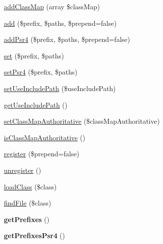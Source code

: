 \begin{DoxyCompactItemize}
\item 
\hyperlink{classComposer_1_1Autoload_1_1ClassLoader_a246d6f628e6ae99bf0ce65b0212f833a}{add\+Class\+Map} (array \$class\+Map)
\item 
\hyperlink{classComposer_1_1Autoload_1_1ClassLoader_aa99f46d61bdf20b924a1bb08bfcb90bd}{add} (\$prefix, \$paths, \$prepend=false)
\item 
\hyperlink{classComposer_1_1Autoload_1_1ClassLoader_a8831c0a7bb01fa44b4cb7a72ec111cf1}{add\+Psr4} (\$prefix, \$paths, \$prepend=false)
\item 
\hyperlink{classComposer_1_1Autoload_1_1ClassLoader_a76f8e2aa4329d78063cc7932108891ce}{set} (\$prefix, \$paths)
\item 
\hyperlink{classComposer_1_1Autoload_1_1ClassLoader_a11d2831d7657855b5c07cb6885dd86ef}{set\+Psr4} (\$prefix, \$paths)
\item 
\hyperlink{classComposer_1_1Autoload_1_1ClassLoader_a350f3d947ee3e29b0ac0e09e4a086642}{set\+Use\+Include\+Path} (\$use\+Include\+Path)
\item 
\hyperlink{classComposer_1_1Autoload_1_1ClassLoader_aeb0360ce32c89c3d50cf5b054aef0d59}{get\+Use\+Include\+Path} ()
\item 
\hyperlink{classComposer_1_1Autoload_1_1ClassLoader_ab393ccb89c488ca52fe97865b0957196}{set\+Class\+Map\+Authoritative} (\$class\+Map\+Authoritative)
\item 
\hyperlink{classComposer_1_1Autoload_1_1ClassLoader_abaf3d2e9cad5d740b6a29c44b36cf015}{is\+Class\+Map\+Authoritative} ()
\item 
\hyperlink{classComposer_1_1Autoload_1_1ClassLoader_a478eedf860efe1bc1b2408fc28656111}{register} (\$prepend=false)
\item 
\hyperlink{classComposer_1_1Autoload_1_1ClassLoader_a2472d57551ee473381beea31ff642136}{unregister} ()
\item 
\hyperlink{classComposer_1_1Autoload_1_1ClassLoader_aee0b004fbf0743f16dab70f8a52f983e}{load\+Class} (\$class)
\item 
\hyperlink{classComposer_1_1Autoload_1_1ClassLoader_a505e9f4e4a29f6bd47bc694e78ae46c3}{find\+File} (\$class)
\item 
{\bfseries get\+Prefixes} ()\hypertarget{classComposer_1_1Autoload_1_1ClassLoader_af3d914a2e97ec1118f3d70e5a0ce6435}{}\label{classComposer_1_1Autoload_1_1ClassLoader_af3d914a2e97ec1118f3d70e5a0ce6435}

\item 
{\bfseries get\+Prefixes\+Psr4} ()\hypertarget{classComposer_1_1Autoload_1_1ClassLoader_a36833139effe6653454d8f02ea8f555b}{}\label{classComposer_1_1Autoload_1_1ClassLoader_a36833139effe6653454d8f02ea8f555b}


\end{DoxyCompactItemize}
